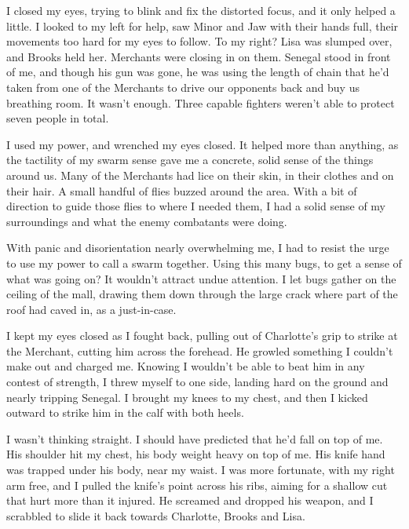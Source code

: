 I closed my eyes, trying to blink and fix the distorted focus, and it only helped a little.  I looked to my left for help, saw Minor and Jaw with their hands full, their movements too hard for my eyes to follow.  To my right?  Lisa was slumped over, and Brooks held her.  Merchants were closing in on them.  Senegal stood in front of me, and though his gun was gone, he was using the length of chain that he'd taken from one of the Merchants to drive our opponents back and buy us breathing room.  It wasn't enough.  Three capable fighters weren't able to protect seven people in total.



I used my power, and wrenched my eyes closed.  It helped more than anything, as the tactility of my swarm sense gave me a concrete, solid sense of the things around us.  Many of the Merchants had lice on their skin, in their clothes and on their hair.  A small handful of flies buzzed around the area.  With a bit of direction to guide those flies to where I needed them, I had a solid sense of my surroundings and what the enemy combatants were doing.



With panic and disorientation nearly overwhelming me, I had to resist the urge to use my power to call a swarm together.  Using this many bugs, to get a sense of what was going on?  It wouldn't attract undue attention.  I let bugs gather on the ceiling of the mall, drawing them down through the large crack where part of the roof had caved in, as a just-in-case.



I kept my eyes closed as I fought back, pulling out of Charlotte's grip to strike at the Merchant, cutting him across the forehead.  He growled something I couldn't make out and charged me.  Knowing I wouldn't be able to beat him in any contest of strength, I threw myself to one side, landing hard on the ground and nearly tripping Senegal.  I brought my knees to my chest, and then I kicked outward to strike him in the calf with both heels.



I wasn't thinking straight.  I should have predicted that he'd fall on top of me.  His shoulder hit my chest, his body weight heavy on top of me.  His knife hand was trapped under his body, near my waist.  I was more fortunate, with my right arm free, and I pulled the knife's point across his ribs, aiming for a shallow cut that hurt more than it injured.  He screamed and dropped his weapon, and I scrabbled to slide it back towards Charlotte, Brooks and Lisa.



